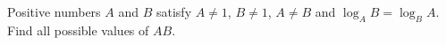 Positive numbers $A$ and $B$ satisfy $A\ne1$, $B\ne1$, $A\ne B$ and $\log_A B=\log_B A$. Find all possible values of $AB$.
